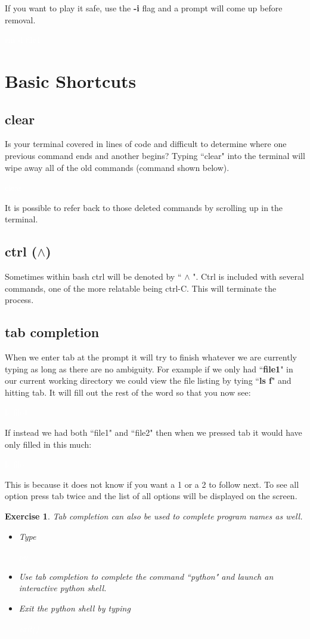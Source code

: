 \documentclass[oneside]{book}
\newcommand{\commandline}[1]{\begin{center} \colorbox{Dark}{\textcolor{white}{#1}} \end{center}}
\newtheorem{ex}{Exercise}[chapter]
\begin{document}
If you want to play it safe, use the \textbf{-i} flag and a prompt will come up before removal.\ 
\commandline{rm -i file1}

\section{Basic Shortcuts}

\subsection{clear}
Is your terminal covered in lines of code and difficult to determine where one previous command ends and another begins? Typing ``clear" into the terminal will wipe away all of the old commands (command shown below).
\commandline{clear}
It is possible to refer back to those deleted commands by scrolling up in the terminal.

\subsection{ctrl ($\wedge$)}
Sometimes within bash ctrl will be denoted by `` $\wedge$ ". Ctrl is included with several commands, one of the more relatable being ctrl-C. This will terminate the process. 

\subsection{tab completion}
When we enter tab at the prompt it will try to finish whatever we are currently typing as long as there are no ambiguity. For example if we only had ``\textbf{file1}" in our current working directory we could view the file listing by tying ``\textbf{ls f}" and hitting tab. It will fill out the rest of the word so that you now see:
\commandline{ls file1}
If instead we had both ``file1" and ``file2" then when we pressed tab it would have only filled in this much:
\commandline{ls file}
This is because it does not know if you want a 1 or a 2 to follow next. To see all option press tab twice and the list of all options will be displayed on the screen.\\

\begin{ex}
    Tab completion can also be used to complete program names as well.
    \begin{itemize} 
        \item Type \commandline{py}
        \item Use tab completion to complete the command ``python" and launch an interactive python shell.
        \item Exit the python shell by typing \commandline{exit()}
    \end{itemize}
\end{ex}
\end{document}
